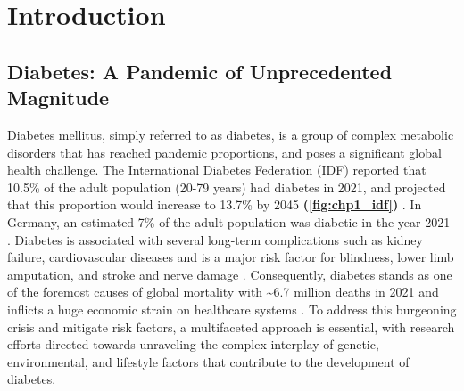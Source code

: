 

\chapter{Introduction}  %
\label{chp:introduction}

\newpage\null\thispagestyle{empty}\newpage



\section[Diabetes: A Pandemic of Unprecedented Magnitude]{Diabetes: A Pandemic of Unprecedented Magnitude}  %
\label{sec:int_diabetes}



Diabetes mellitus, simply referred to as diabetes, is a group of complex metabolic disorders that has reached pandemic proportions, and poses a significant global health challenge. The International Diabetes Federation (IDF) reported that 10.5\% of the adult population (20-79 years) had diabetes in 2021, and projected that this proportion would increase to 13.7\% by 2045 \textbf{(\autoref{fig:chp1_idf})} \textbf{\cite{home_idf_nodate}}. In Germany, an estimated 7\% of the adult population was diabetic in the year 2021 \textbf{\cite{noauthor_germany_nodate}}. Diabetes is associated with several long-term complications such as kidney failure, cardiovascular diseases and is a major risk factor for blindness, lower limb amputation,%
 and stroke and nerve damage \textbf{\cite{ashcroft_diabetes_2012,the_emerging_risk_factors_collaboration_diabetes_2010,leon_diabetes_2015}}. Consequently, diabetes stands as one of the foremost causes of global mortality with \textasciitilde6.7 million deaths in 2021 and inflicts a huge economic strain on healthcare systems  \textbf{\cite{home_idf_nodate}}. To address this burgeoning crisis and mitigate risk factors, a multifaceted approach is essential, with research efforts directed towards unraveling the complex interplay of genetic, environmental, and lifestyle factors that contribute to the development of diabetes.

